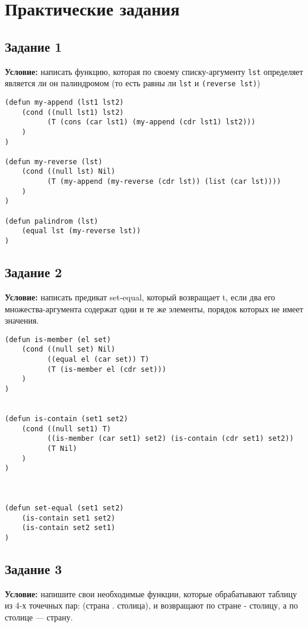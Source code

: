 \chapter{Практические задания}

\section{Задание 1}

\textbf{Условие:} написать функцию, которая по своему списку-аргументу \texttt{lst} определяет является ли он палиндромом (то есть равны ли \texttt{lst} и \texttt{(reverse lst)})

\begin{lstlisting}
(defun my-append (lst1 lst2)
    (cond ((null lst1) lst2)
          (T (cons (car lst1) (my-append (cdr lst1) lst2)))
    )
)

(defun my-reverse (lst)
    (cond ((null lst) Nil)
          (T (my-append (my-reverse (cdr lst)) (list (car lst))))
    )
)

(defun palindrom (lst)
    (equal lst (my-reverse lst))
)
\end{lstlisting}


\section{Задание 2}

\textbf{Условие:} написать предикат set-equal, который возвращает t, если два его множества-аргумента содержат одни и те же элементы, порядок которых не имеет значения.

\begin{lstlisting}
(defun is-member (el set)
    (cond ((null set) Nil)
          ((equal el (car set)) T)
          (T (is-member el (cdr set)))
    )
)


(defun is-contain (set1 set2)
    (cond ((null set1) T)
          ((is-member (car set1) set2) (is-contain (cdr set1) set2))
          (T Nil)
    )
)



(defun set-equal (set1 set2)
    (is-contain set1 set2)
    (is-contain set2 set1)
)
\end{lstlisting}


\section{Задание 3}

\textbf{Условие:} напишите свои необходимые функции, которые обрабатывают таблицу из 4-х точечных пар: (страна . столица), и возвращают по стране - столицу, а по столице — страну.


